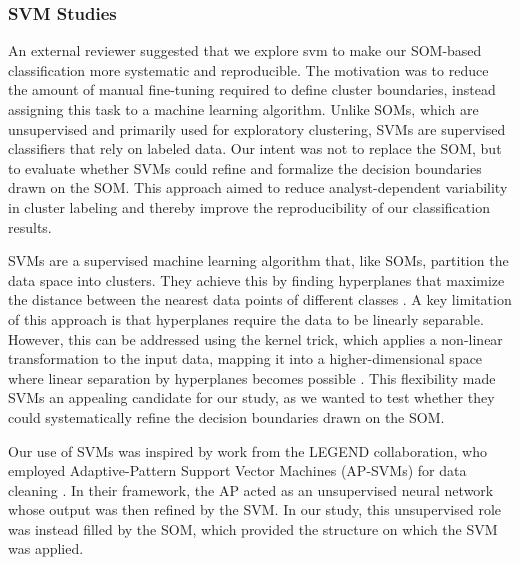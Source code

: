 
\subsubsection{SVM Studies}

An external reviewer suggested that we explore \gls{svm} to make our SOM-based classification more systematic and reproducible. The motivation was to reduce the amount of manual fine-tuning required to define cluster boundaries, instead assigning this task to a machine learning algorithm. Unlike SOMs, which are unsupervised and primarily used for exploratory clustering, SVMs are supervised classifiers that rely on labeled data. Our intent was not to replace the SOM, but to evaluate whether SVMs could refine and formalize the decision boundaries drawn on the SOM. This approach aimed to reduce analyst-dependent variability in cluster labeling and thereby improve the reproducibility of our classification results.

SVMs are a supervised machine learning algorithm that, like SOMs, partition the data space into clusters. They achieve this by finding hyperplanes that maximize the distance between the nearest data points of different classes \cite{svm_cover}. A key limitation of this approach is that hyperplanes require the data to be linearly separable. However, this can be addressed using the kernel trick, which applies a non-linear transformation to the input data, mapping it into a higher-dimensional space where linear separation by hyperplanes becomes possible \cite{Aizerman67theoretical, Moguerza_2006}. This flexibility made SVMs an appealing candidate for our study, as we wanted to test whether they could systematically refine the decision boundaries drawn on the SOM.

Our use of SVMs was inspired by work from the LEGEND collaboration, who employed Adaptive-Pattern Support Vector Machines (AP-SVMs) for data cleaning \cite{Leon:2024geh}. In their framework, the AP acted as an unsupervised neural network whose output was then refined by the SVM. In our study, this unsupervised role was instead filled by the SOM, which provided the structure on which the SVM was applied.

